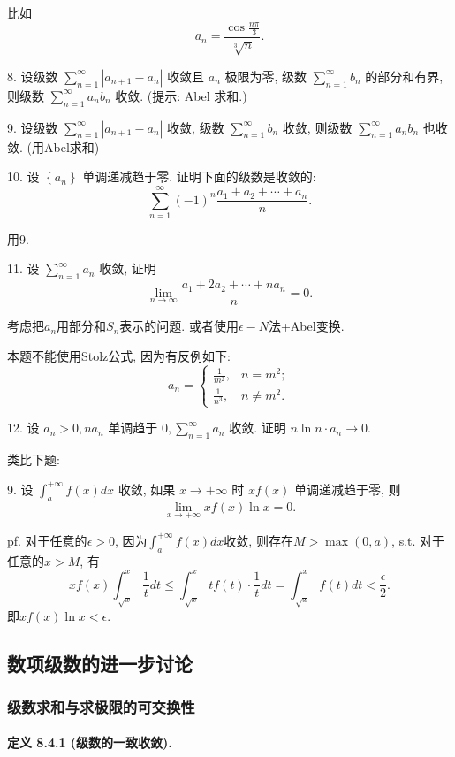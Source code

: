 比如
\[
a_{n}=\frac{\cos\frac{n\pi}{3}}{\sqrt[3]{n}}.
\]

8. 设级数 $\sum_{n=1}^{\infty}\left|a_{n+1}-a_{n}\right|$ 收敛且 $a_{n}$
极限为零, 级数 $\sum_{n=1}^{\infty}b_{n}$ 的部分和有界, 则级数 $\sum_{n=1}^{\infty}a_{n}b_{n}$
收敛. (提示: Abel 求和.)

9. 设级数 $\sum_{n=1}^{\infty}\left|a_{n+1}-a_{n}\right|$ 收敛, 级数 $\sum_{n=1}^{\infty}b_{n}$
收敛, 则级数 $\sum_{n=1}^{\infty}a_{n}b_{n}$ 也收敛. (用Abel求和)

10. 设 $\left\{ a_{n}\right\} $ 单调递减趋于零. 证明下面的级数是收敛的: 
\[
\sum_{n=1}^{\infty}(-1)^{n}\frac{a_{1}+a_{2}+\cdots+a_{n}}{n}.
\]

用9.

11. 设 $\sum_{n=1}^{\infty}a_{n}$ 收敛, 证明 
\[
\lim_{n\rightarrow\infty}\frac{a_{1}+2a_{2}+\cdots+na_{n}}{n}=0.
\]

考虑把$a_{n}$用部分和$S_{n}$表示的问题. 或者使用$\epsilon-N$法+Abel变换.

本题不能使用Stolz公式, 因为有反例如下:
\[
a_{n}=\begin{cases}
	\frac{1}{m^{2}}, & n=m^{2};\\
	\frac{1}{n^{3}}, & n\ne m^{2}.
\end{cases}
\]

12. 设 $a_{n}>0,na_{n}$ 单调趋于 $0,\sum_{n=1}^{\infty}a_{n}$ 收敛. 证明
$n\ln n\cdot a_{n}\rightarrow0$.

类比下题:

9. 设 $\int_{a}^{+\infty}f(x)dx$ 收敛, 如果 $x\rightarrow+\infty$ 时 $xf(x)$
单调递减趋于零, 则 
\[
\lim_{x\rightarrow+\infty}xf(x)\ln x=0.
\]

pf. 对于任意的$\epsilon>0$, 因为$\int_{a}^{+\infty}f(x)dx$收敛, 则存在$M>\max(0,a)$,
s.t. 对于任意的$x>M$, 有
\[
xf(x)\int_{\sqrt{x}}^{x}\frac{1}{t}dt\le\int_{\sqrt{x}}^{x}tf(t)\cdot\frac{1}{t}dt=\int_{\sqrt{x}}^{x}f(t)dt<\frac{\epsilon}{2}.
\]
即$xf(x)\ln x<\epsilon$.

\subsection{数项级数的进一步讨论}

\subsubsection{级数求和与求极限的可交换性}

\paragraph{定义 8.4.1 (级数的一致收敛). }

